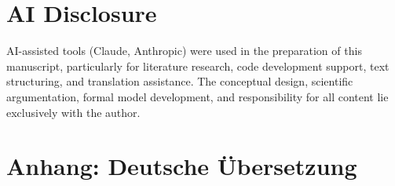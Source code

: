 \documentclass[12pt,a4paper]{article}
\begin{document}
\section*{AI Disclosure}

AI-assisted tools (Claude, Anthropic) were used in the preparation of this manuscript, particularly for literature research, code development support, text structuring, and translation assistance. The conceptual design, scientific argumentation, formal model development, and responsibility for all content lie exclusively with the author.




%
%

\clearpage
\appendix
{}

\section*{Anhang: Deutsche \"Ubersetzung}
\end{document}

